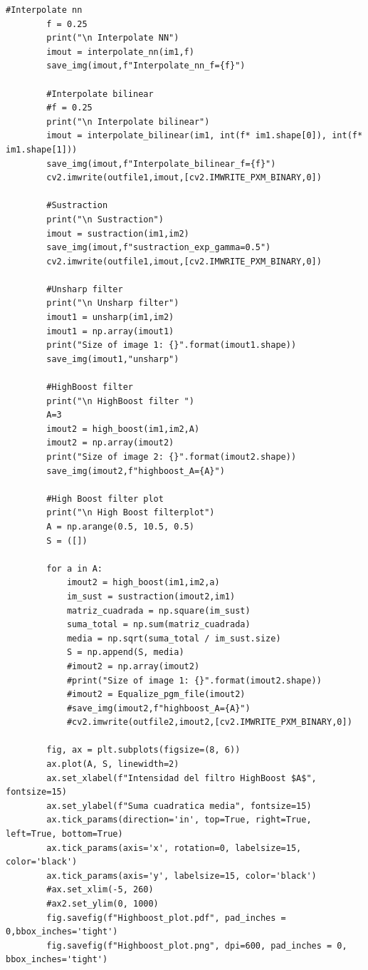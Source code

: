 \documentclass[11pt,twocolumn,twoside]{opticajnl}
\begin{document}
\begin{onecolumn}
\begin{lstlisting}[style=mystyle]
        #Interpolate nn
        f = 0.25
        print("\n Interpolate NN")
        imout = interpolate_nn(im1,f)
        save_img(imout,f"Interpolate_nn_f={f}")
    
        #Interpolate bilinear
        #f = 0.25
        print("\n Interpolate bilinear")
        imout = interpolate_bilinear(im1, int(f* im1.shape[0]), int(f* im1.shape[1]))
        save_img(imout,f"Interpolate_bilinear_f={f}")
        cv2.imwrite(outfile1,imout,[cv2.IMWRITE_PXM_BINARY,0])
    
        #Sustraction
        print("\n Sustraction")
        imout = sustraction(im1,im2)
        save_img(imout,f"sustraction_exp_gamma=0.5")
        cv2.imwrite(outfile1,imout,[cv2.IMWRITE_PXM_BINARY,0])
    
        #Unsharp filter
        print("\n Unsharp filter")
        imout1 = unsharp(im1,im2)
        imout1 = np.array(imout1)
        print("Size of image 1: {}".format(imout1.shape))
        save_img(imout1,"unsharp")
    
        #HighBoost filter
        print("\n HighBoost filter ")
        A=3
        imout2 = high_boost(im1,im2,A)
        imout2 = np.array(imout2)
        print("Size of image 2: {}".format(imout2.shape))
        save_img(imout2,f"highboost_A={A}")
    
        #High Boost filter plot
        print("\n High Boost filterplot")
        A = np.arange(0.5, 10.5, 0.5)
        S = ([])
    
        for a in A:
            imout2 = high_boost(im1,im2,a)
            im_sust = sustraction(imout2,im1)
            matriz_cuadrada = np.square(im_sust)
            suma_total = np.sum(matriz_cuadrada)
            media = np.sqrt(suma_total / im_sust.size)
            S = np.append(S, media)
            #imout2 = np.array(imout2)
            #print("Size of image 1: {}".format(imout2.shape))
            #imout2 = Equalize_pgm_file(imout2)
            #save_img(imout2,f"highboost_A={A}")
            #cv2.imwrite(outfile2,imout2,[cv2.IMWRITE_PXM_BINARY,0])
        
        fig, ax = plt.subplots(figsize=(8, 6))
        ax.plot(A, S, linewidth=2)
        ax.set_xlabel(f"Intensidad del filtro HighBoost $A$", fontsize=15)
        ax.set_ylabel(f"Suma cuadratica media", fontsize=15)
        ax.tick_params(direction='in', top=True, right=True, left=True, bottom=True)
        ax.tick_params(axis='x', rotation=0, labelsize=15, color='black')
        ax.tick_params(axis='y', labelsize=15, color='black')
        #ax.set_xlim(-5, 260)
        #ax2.set_ylim(0, 1000)
        fig.savefig(f"Highboost_plot.pdf", pad_inches = 0,bbox_inches='tight')
        fig.savefig(f"Highboost_plot.png", dpi=600, pad_inches = 0, bbox_inches='tight')
\end{lstlisting}
\end{onecolumn}
\end{document}
